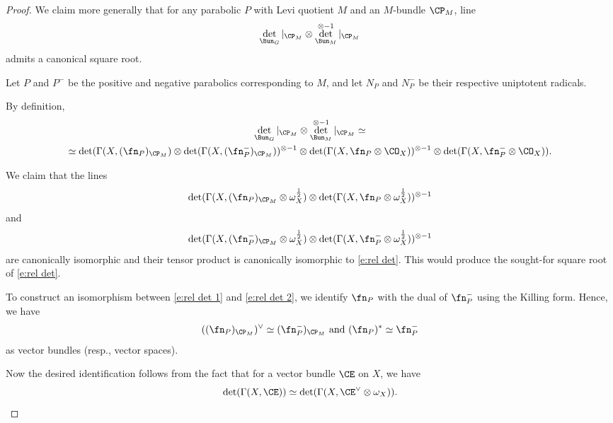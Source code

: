 \documentclass[9pt]{amsart}
\theoremstyle{remark}
\theoremstyle{definition}
\theoremstyle{remark}
\numberwithin{equation}{section}
\begin{document}
\begin{proof} 

We claim more generally that for any parabolic $P$ with Levi quotient $M$ and an $M$-bundle $\CP_M$, line 
$$\det_{\Bun_G}|_{\CP_M}\otimes \det^{\otimes -1}_{\Bun_M}|_{\CP_M}$$
admits a canonical square root.

\medskip

Let $P$ and $P^-$ be the positive and negative parabolics corresponding to $M$, and let
$N_P$ and $N^-_P$ be their respective uniptotent radicals. 

\medskip

By definition,
\begin{multline} \label{e:rel det}
\det_{\Bun_G}|_{\CP_M}\otimes \det^{\otimes -1}_{\Bun_M}|_{\CP_M}\simeq \\
\simeq \det(\Gamma(X,(\fn_P)_{\CP_M})\otimes \det(\Gamma(X,(\fn^-_P)_{\CP_M}))^{\otimes -1}
\otimes \det(\Gamma(X,\fn_P\otimes \CO_X))^{\otimes -1}\otimes \det(\Gamma(X,\fn^-_P\otimes \CO_X)).
\end{multline} 

We claim that the lines
\begin{equation} \label{e:rel det 1}
\det(\Gamma(X,(\fn_P)_{\CP_M}\otimes \omega_X^{\frac{1}{2}})\otimes 
\det(\Gamma(X,\fn_P\otimes \omega_X^{\frac{1}{2}}))^{\otimes -1}
\end{equation} 
and 
\begin{equation} \label{e:rel det 2}
\det(\Gamma(X,(\fn^-_P)_{\CP_M}\otimes \omega_X^{\frac{1}{2}})\otimes 
\det(\Gamma(X,\fn^-_P\otimes \omega_X^{\frac{1}{2}}))^{\otimes -1}
\end{equation} 
are canonically isomorphic and their tensor product is canonically isomorphic to \eqref{e:rel det}.
This would produce the sought-for square root of \eqref{e:rel det}.

\medskip

To construct an isomorphism between \eqref{e:rel det 1} and \eqref{e:rel det 2}, we identify $\fn_P$ with
the dual of $\fn^-_P$ using the Killing form. Hence, we have
\begin{equation} \label{e:vector bundle duality}
((\fn_P)_{\CP_M})^\vee \simeq (\fn^-_P)_{\CP_M} \text{ and } (\fn_P)^*\simeq \fn^-_P
\end{equation}
as vector bundles (resp., vector spaces). 

\medskip

Now the desired identification follows from the fact that
for a vector bundle $\CE$ on $X$, we have
\begin{equation}
\det(\Gamma(X,\CE))\simeq \det(\Gamma(X,\CE^\vee\otimes \omega_X)).
\end{equation} 


\end{proof}
\end{document}

